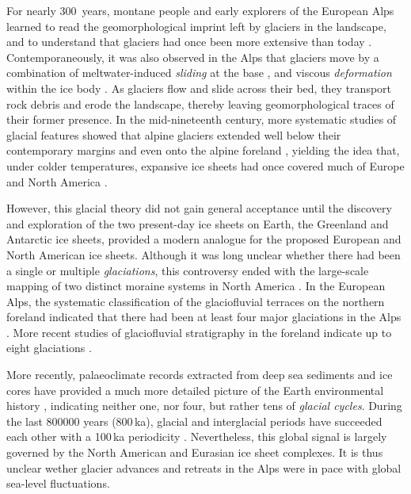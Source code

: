 \documentclass[tc, manuscript]{copernicus}
\begin{document}
    For nearly 300~years, montane people and early explorers of the European
    Alps learned to read the geomorphological imprint left by glaciers in the
    landscape, and to understand that glaciers had once been more extensive
    than today \citep[e.g.,][p.~21]{Windham.Martel.1744}. Contemporaneously,
    it was also observed in the Alps that glaciers move by a combination of
    meltwater-induced \emph{sliding} at the base \citep[\S532]{Saussure.1779},
    and viscous \emph{deformation} within the ice body \citep{Forbes.1846b}. As
    glaciers flow and slide across their bed, they transport rock debris and
    erode the landscape, thereby leaving geomorphological traces of their
    former presence. In the mid-nineteenth
    century, more systematic studies of glacial features showed that alpine
    glaciers extended well below their contemporary margins \citep{Venetz.1821}
    and even onto the alpine foreland \citep{Charpentier.1841}, yielding the
    idea that, under colder temperatures, expansive ice sheets had once covered
    much of Europe and North America \citep{Agassiz.1840}.

    However, this glacial theory did not gain general acceptance until the
    discovery and exploration of the two present-day ice sheets on Earth, the
    Greenland and Antarctic ice sheets, provided a modern analogue for the
    proposed European and North American ice sheets. Although it was long
    unclear whether there had been a single or multiple \emph{glaciations},
    this controversy ended with the large-scale mapping of two distinct moraine
    systems in North America \citep{Chamberlin.1894}. In the European Alps, the
    systematic classification of the glaciofluvial terraces on the northern
    foreland indicated that there had been at least four major
    glaciations in the Alps \citep{Penck.Bruckner.1909}. More recent studies
    of glaciofluvial stratigraphy in the foreland indicate up to eight
    glaciations \citep{Ivy-Ochs.etal.2008, Preusser.etal.2011}.

    More recently, palaeoclimate records extracted from deep sea sediments and
    ice cores have provided a much more detailed picture of the Earth
    environmental history \citep[e.g.,][]{Emiliani.1955,
    Shackleton.Opdyke.1973, Dansgaard.etal.1993, Augustin.etal.2004},
    indicating neither one, nor four, but rather tens of \emph{glacial cycles}.
    During the last 800000 years (800\,ka), glacial and interglacial periods
    have succeeded each other with a 100\,ka periodicity \citep{Hays.etal.1976,
    Augustin.etal.2004}. Nevertheless, this global signal is largely governed
    by the North American and Eurasian ice sheet complexes. It is thus unclear
    wether glacier advances and retreats in the Alps were in pace with global
    sea-level fluctuations.
\end{document}
